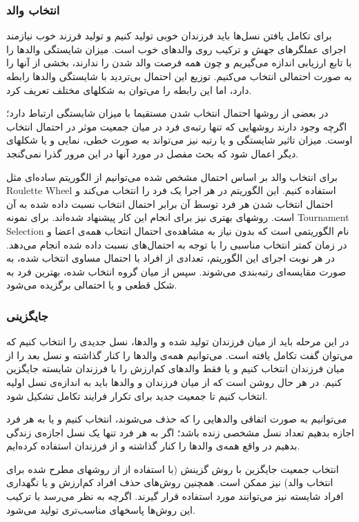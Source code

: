 \documentclass{report}
\begin{document}
\subsubsection{انتخاب والد}
برای تکامل یافتن نسل‌ها باید فرزندان خوبی تولید کنیم و تولید فرزند خوب نیازمند اجرای عملگرهای جهش و ترکیب روی والدهای خوب است. میزان شایستگی والدها را با تابع ارزیابی اندازه می‌گیریم و چون همه فرصت والد شدن را ندارند، بخشی از آنها را به صورت احتمالی انتخاب می‌کنیم. توزیع این احتمال بی‌تردید با شایستگی والدها رابطه دارد، اما این رابطه را می‌توان به شکلهای مختلف تعریف کرد.

در بعضی از روشها احتمال انتخاب شدن مستقیما با میزان شایستگی ارتباط دارد؛‌ اگرچه وجود دارند روشهایی که تنها رتبه‌ی فرد در میان جمعیت موثر در احتمال انتخاب اوست. میزان تاثیر شایستگی و یا رتبه نیز می‌تواند به صورت خطی، نمایی و یا شکلهای دیگر اعمال شود که بحث مفصل در مورد آنها در این مرور گذرا نمی‌گنجد.

برای انتخاب والد بر اساس احتمال مشخص شده می‌توانیم از الگوریتم ساده‌ای مثل Roulette Wheel استفاده کنیم. این الگوریتم در هر اجرا یک فرد را انتخاب می‌کند و احتمال انتخاب شدن هر فرد توسط آن برابر احتمال انتخاب نسبت داده شده به آن است. روشهای بهتری نیز برای انجام این کار پیشنهاد شده‌اند. برای نمونه Tournament Selection نام الگوریتمی است که بدون نیاز به مشاهده‌ی احتمال انتخاب همه‌ی اعضا و در زمان کمتر انتخاب مناسبی را با توجه به احتمال‌های نسبت داده شده انجام می‌دهد. در هر نوبت اجرای این الگوریتم، تعدادی از افراد با احتمال مساوی انتخاب شده، به صورت مقایسه‌ای رتبه‌بندی می‌شوند. سپس از میان گروه انتخاب شده، بهترین فرد به شکل قطعی و یا احتمالی برگزیده می‌شود.   

\subsubsection{جایگزینی}
در این مرحله باید از میان فرزندان تولید شده و والدها، نسل جدیدی را انتخاب کنیم که می‌توان گفت تکامل یافته است. می‌توانیم همه‌ی والدها را کنار گذاشته و نسل بعد را از میان فرزندان انتخاب کنیم و یا فقط والدهای کم‌ارزش را با فرزندان شایسته جایگزین کنیم. در هر حال روشن است که از میان فرزندان و والدها باید به اندازه‌ی نسل اولیه انتخاب کنیم تا جمعیت جدید برای تکرار فرایند تکامل تشکیل شود.

می‌توانیم به صورت اتفاقی والدهایی را که حذف می‌شوند، انتخاب کنیم و یا به هر فرد اجازه بدهیم تعداد نسل مشخصی زنده باشد؛ اگر به هر فرد تنها یک نسل اجازه‌ی زندگی بدهیم در واقع همه‌ی والدها را کنار گذاشته و از فرزندان استفاده کرده‌ایم.

انتخاب جمعیت جایگزین با روش گزینش (با استفاده از از روشهای مطرح شده برای انتخاب والد) نیز ممکن است. همچنین روش‌های حذف افراد کم‌ارزش و یا نگهداری افراد شایسته نیز می‌توانند مورد استفاده قرار گیرند. اگرچه به نظر می‌رسد با ترکیب این روش‌ها پاسخهای مناسب‌تری تولید می‌شود.
\end{document}
